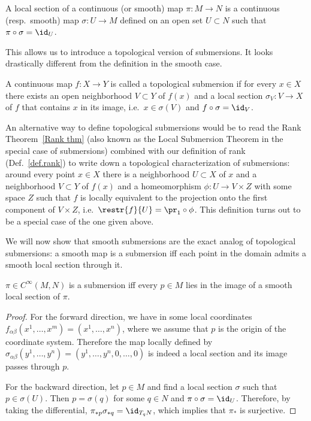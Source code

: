 \begin{defn}
A local section of a continuous (or smooth) map $\pi:M\to N$ is a continuous (resp.~smooth) map $\sigma :U\to M$ defined on an open set $U\subset N$ such that $\pi\circ\sigma =\id_U$.
\end{defn}

This allows us to introduce a topological version of submersions. It looks drastically different from the definition in the smooth case.

\begin{defn}
    A continuous map $f:X\to Y$ is called a topological submersion if for every $x\in X$ there exists an open neighborhood $V\subset Y$ of $f(x)$ and a local section $\sigma_V:V\to X$ of $f$ that contains $x$ in its image, i.e.~$x\in \sigma(V)$ and $f\circ\sigma=\id_V$. 
\end{defn}

An alternative way to define topological submersions would be to read the Rank Theorem~\ref{Rank thm} (also known as the Local Submersion Theorem in the special case of submersions) combined with our definition of rank (Def.~\ref{def.rank}) to write down a topological characterization of submersions: around every point $x\in X$ there is a neighborhood $U\subset X$ of $x$ and a neighborhood $V\subset Y$ of $f(x)$ and a homeomorphism $\phi:U\to V\times Z$ with some space $Z$ such that $f$ is locally equivalent to the projection onto the first component of $V\times Z$, i.e.~$\restr{f}{U}=\pr_1\circ \phi$. This definition turns out to be a special case of the one given above.

We will now show that smooth submersions are the exact analog of topological submersions: a smooth map is a submersion iff each point in the domain admits a smooth local section through it.

\begin{thm}\label{thm: local section}
    $\pi\in C^\infty(M,N)$ is a submersion iff every $p\in M$ lies in the image of a smooth local section of $\pi$.
\end{thm}
\begin{proof}
    For the forward direction, we have in some local coordinates $f_{\alpha\beta}(x^1,\ldots,x^m)=(x^1,\ldots,x^n)$, where we assume that $p$ is the origin of the coordinate system. Therefore the map locally defined by $\sigma_{\alpha\beta}(y^1,\ldots,y^n)=(y^1,\ldots,y^n,0,\ldots,0)$ is indeed a local section and its image passes through $p$.
    
    For the backward direction, let $p\in M$ and find a local section $\sigma$ such that $p\in \sigma(U)$. Then $p=\sigma(q)$ for some $q\in N$ and $\pi\circ\sigma=\id_U$. Therefore, by taking the differential, $\pi_{\ast p} \sigma_{\ast q}=\id_{T_q N}$, which implies that $\pi_\ast$ is surjective.
    \end{proof}
    
